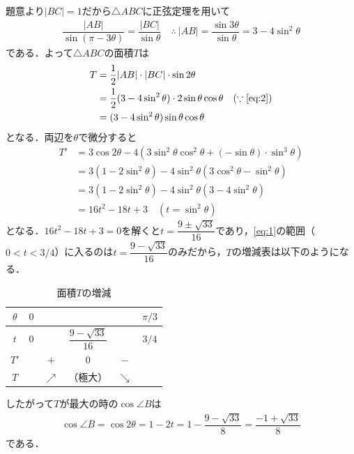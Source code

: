 \documentclass[../../main.tex]{subfiles}
\begin{document}
題意より$|BC|=1$だから$\triangle ABC$に正弦定理を用いて
\begin{align}
  \dfrac{|AB|}{\sin(\pi-3\theta)}=\dfrac{|BC|}{\sin\theta}
  \quad\therefore\ |AB|=\dfrac{\sin3\theta}{\sin\theta}=3-4\sin^2\theta \label{eq:2}
\end{align}
である．よって$\triangle ABC$の面積$T$は
\begin{align}
  T
  &=\dfrac{1}{2}|AB|\cdot|BC|\cdot\sin2\theta\\
  &=\dfrac{1}{2}(3-4\sin^2\theta)\cdot2\sin\theta\cos\theta \quad (\because\text{\cref{eq:2}})\\
  &=(3-4\sin^2\theta)\sin\theta\cos\theta \label{eq:3}
\end{align}
となる．両辺を$\theta$で微分すると
\begin{align}
  T'
  &=3\cos2\theta-4(3\sin^2\theta\cos^2\theta+(-\sin\theta)\cdot \sin^3\theta) \\
  &=3(1-2\sin^2\theta)-4\sin^2\theta(3\cos^2\theta-\sin^2\theta) \\
  &=3(1-2\sin^2\theta)-4\sin^2\theta(3-4\sin^2\theta) \\
  &=16t^2-18t+3 \quad (t=\sin^2\theta)
\end{align}
となる．$16t^2-18t+3=0$を解くと$t=\dfrac{9\pm\sqrt{33}}{16}$であり，\cref{eq:1}の範囲（$0<t<3/4$）に入るのは$t=\dfrac{9-\sqrt{33}}{16}$のみだから，$T$の増減表は以下のようになる．

\begin{table}[htb]
  \centering
  \caption{面積$T$の増減}
  \begin{tabular}{c|ccccc}
    $\theta$ & $0$ & & & & $\pi/3$ \\
    \hline
    $t$ & $0$ & & $\dfrac{9-\sqrt{33}}{16}$ & & $3/4$ \\
    \hline
    $T'$ & & $+$ & $0$ & $-$ & \\
    \hline
    $T$ & & $\nearrow$ & （極大） & $\searrow$ & \\
  \end{tabular}
\end{table}

したがって$T$が最大の時の$\cos \angle B$は
\begin{align}
  \cos\angle B=\cos2\theta=1-2t=1-\dfrac{9-\sqrt{33}}{8}=\dfrac{-1+\sqrt{33}}{8}
\end{align}
である．

\newpage
\end{document}

